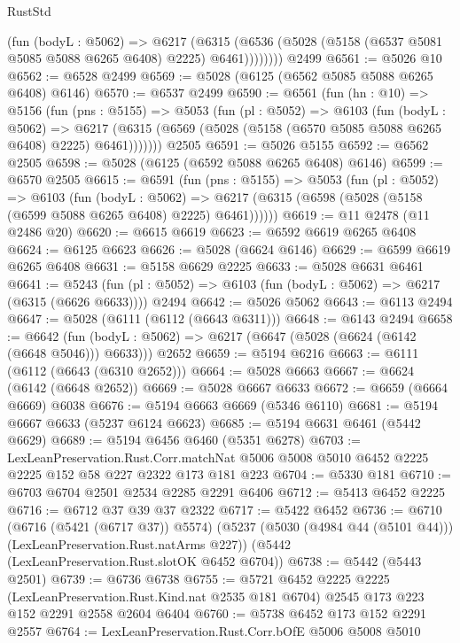 \begin{lexlean}{RustStd}
\begin{coremodule}
            (fun (bodyL : @5062) =>
            @6217
              (@6315 (@6536 (@5028 (@5158 (@6537 @5081 @5085 @5088 @6265 @6408) @2225) @6461))))))))
    @2499
@6561 := @5026 @10
@6562 := @6528 @2499
@6569 := @5028 (@6125 (@6562 @5085 @5088 @6265 @6408) @6146)
@6570 := @6537 @2499
@6590 := @6561
    (fun (hn : @10) =>
    @5156
      (fun (pns : @5155) =>
      @5053
        (fun (pl : @5052) =>
        @6103
          (fun (bodyL : @5062) =>
          @6217 (@6315 (@6569 (@5028 (@5158 (@6570 @5085 @5088 @6265 @6408) @2225) @6461)))))))
    @2505
@6591 := @5026 @5155
@6592 := @6562 @2505
@6598 := @5028 (@6125 (@6592 @5088 @6265 @6408) @6146)
@6599 := @6570 @2505
@6615 := @6591
    (fun (pns : @5155) =>
    @5053
      (fun (pl : @5052) =>
      @6103
        (fun (bodyL : @5062) =>
        @6217 (@6315 (@6598 (@5028 (@5158 (@6599 @5088 @6265 @6408) @2225) @6461))))))
@6619 := @11 @2478 (@11 @2486 @20)
@6620 := @6615 @6619
@6623 := @6592 @6619 @6265 @6408
@6624 := @6125 @6623
@6626 := @5028 (@6624 @6146)
@6629 := @6599 @6619 @6265 @6408
@6631 := @5158 @6629 @2225
@6633 := @5028 @6631 @6461
@6641 := @5243
    (fun (pl : @5052) => @6103 (fun (bodyL : @5062) => @6217 (@6315 (@6626 @6633))))
    @2494
@6642 := @5026 @5062
@6643 := @6113 @2494
@6647 := @5028 (@6111 (@6112 (@6643 @6311)))
@6648 := @6143 @2494
@6658 := @6642
    (fun (bodyL : @5062) => @6217 (@6647 (@5028 (@6624 (@6142 (@6648 @5046))) @6633)))
    @2652
@6659 := @5194 @6216
@6663 := @6111 (@6112 (@6643 (@6310 @2652)))
@6664 := @5028 @6663
@6667 := @6624 (@6142 (@6648 @2652))
@6669 := @5028 @6667 @6633
@6672 := @6659 (@6664 @6669) @6038
@6676 := @5194 @6663 @6669 (@5346 @6110)
@6681 := @5194 @6667 @6633 (@5237 @6124 @6623)
@6685 := @5194 @6631 @6461 (@5442 @6629)
@6689 := @5194 @6456 @6460 (@5351 @6278)
@6703 := LexLeanPreservation.Rust.Corr.matchNat
    @5006
    @5008
    @5010
    @6452
    @2225
    @2225
    @152
    @58
    @227
    @2322
    @173
    @181
    @223
@6704 := @5330 @181
@6710 := @6703 @6704 @2501 @2534 @2285 @2291 @6406
@6712 := @5413 @6452 @2225
@6716 := @6712 @37 @39 @37 @2322
@6717 := @5422 @6452
@6736 := @6710
    (@6716 (@5421 (@6717 @37)) @5574)
    (@5237 (@5030 (@4984 @44 (@5101 @44))) (LexLeanPreservation.Rust.natArms @227))
    (@5442 (LexLeanPreservation.Rust.slotOK @6452 @6704))
@6738 := @5442 (@5443 @2501)
@6739 := @6736 @6738
@6755 := @5721
    @6452
    @2225
    @2225
    (LexLeanPreservation.Rust.Kind.nat @2535 @181 @6704)
    @2545
    @173
    @223
    @152
    @2291
    @2558
    @2604
    @6404
@6760 := @5738 @6452 @173 @152 @2291 @2557
@6764 := LexLeanPreservation.Rust.Corr.bOfE @5006 @5008 @5010

\end{coremodule}
\end{lexlean}
